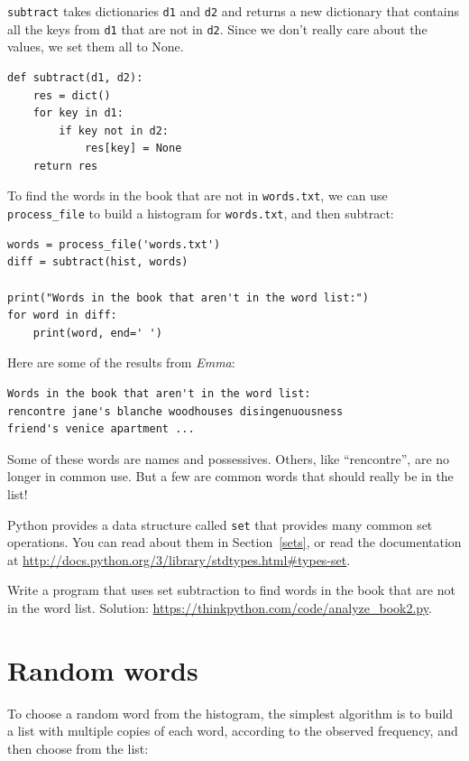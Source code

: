\documentclass[10pt]{book}
\begin{document}
{\tt subtract} takes dictionaries {\tt d1} and {\tt d2} and returns a
new dictionary that contains all the keys from {\tt d1} that are not
in {\tt d2}.  Since we don't really care about the values, we
set them all to None.

\begin{verbatim}
def subtract(d1, d2):
    res = dict()
    for key in d1:
        if key not in d2:
            res[key] = None
    return res
\end{verbatim}
%
To find the words in the book that are not in {\tt words.txt},
we can use \verb"process_file" to build a histogram for
{\tt words.txt}, and then subtract:

\begin{verbatim}
words = process_file('words.txt')
diff = subtract(hist, words)

print("Words in the book that aren't in the word list:")
for word in diff:
    print(word, end=' ')
\end{verbatim}
%
Here are some of the results from {\em Emma}:

\begin{verbatim}
Words in the book that aren't in the word list:
rencontre jane's blanche woodhouses disingenuousness
friend's venice apartment ...
\end{verbatim}
%
Some of these words are names and possessives.  Others, like
``rencontre'', are no longer in common use.  But a few are common
words that should really be in the list!

\begin{exercise}

Python provides a data structure called {\tt set} that provides many
common set operations.  You can read about them in Section~\ref{sets},
or read the documentation at
\url{http://docs.python.org/3/library/stdtypes.html#types-set}.

Write a program that uses set subtraction to find words in the book
that are not in the word list.  Solution:
\url{https://thinkpython.com/code/analyze_book2.py}.

\end{exercise}


\section{Random words}
\label{randomwords}

To choose a random word from the histogram, the simplest algorithm
is to build a list with multiple copies of each word, according
to the observed frequency, and then choose from the list:
\end{document}
